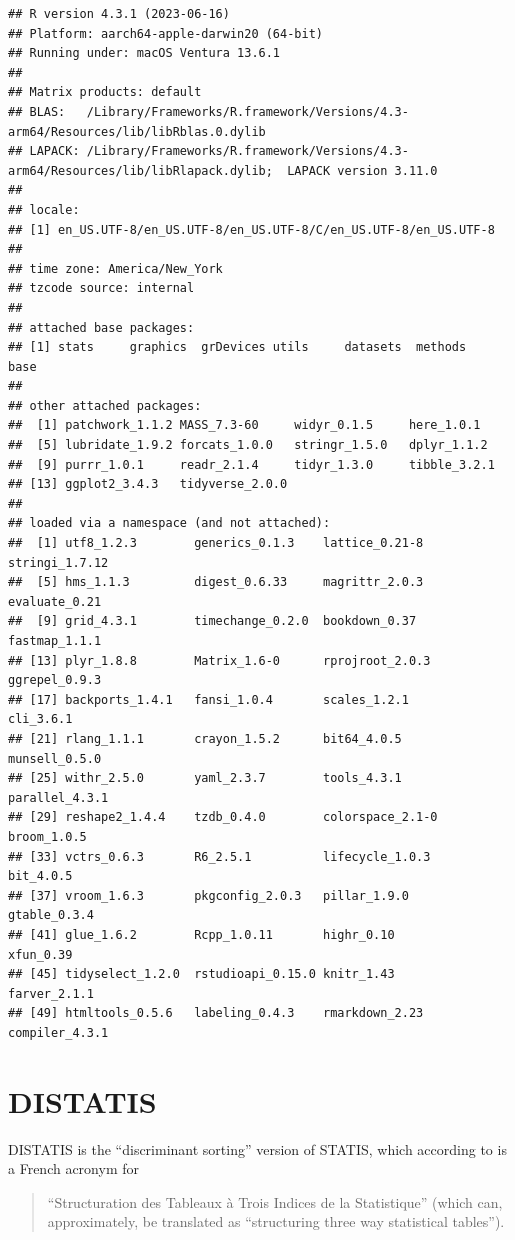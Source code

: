 \documentclass[
]{book}
\begin{document}
\begin{verbatim}
## R version 4.3.1 (2023-06-16)
## Platform: aarch64-apple-darwin20 (64-bit)
## Running under: macOS Ventura 13.6.1
## 
## Matrix products: default
## BLAS:   /Library/Frameworks/R.framework/Versions/4.3-arm64/Resources/lib/libRblas.0.dylib 
## LAPACK: /Library/Frameworks/R.framework/Versions/4.3-arm64/Resources/lib/libRlapack.dylib;  LAPACK version 3.11.0
## 
## locale:
## [1] en_US.UTF-8/en_US.UTF-8/en_US.UTF-8/C/en_US.UTF-8/en_US.UTF-8
## 
## time zone: America/New_York
## tzcode source: internal
## 
## attached base packages:
## [1] stats     graphics  grDevices utils     datasets  methods   base     
## 
## other attached packages:
##  [1] patchwork_1.1.2 MASS_7.3-60     widyr_0.1.5     here_1.0.1     
##  [5] lubridate_1.9.2 forcats_1.0.0   stringr_1.5.0   dplyr_1.1.2    
##  [9] purrr_1.0.1     readr_2.1.4     tidyr_1.3.0     tibble_3.2.1   
## [13] ggplot2_3.4.3   tidyverse_2.0.0
## 
## loaded via a namespace (and not attached):
##  [1] utf8_1.2.3        generics_0.1.3    lattice_0.21-8    stringi_1.7.12   
##  [5] hms_1.1.3         digest_0.6.33     magrittr_2.0.3    evaluate_0.21    
##  [9] grid_4.3.1        timechange_0.2.0  bookdown_0.37     fastmap_1.1.1    
## [13] plyr_1.8.8        Matrix_1.6-0      rprojroot_2.0.3   ggrepel_0.9.3    
## [17] backports_1.4.1   fansi_1.0.4       scales_1.2.1      cli_3.6.1        
## [21] rlang_1.1.1       crayon_1.5.2      bit64_4.0.5       munsell_0.5.0    
## [25] withr_2.5.0       yaml_2.3.7        tools_4.3.1       parallel_4.3.1   
## [29] reshape2_1.4.4    tzdb_0.4.0        colorspace_2.1-0  broom_1.0.5      
## [33] vctrs_0.6.3       R6_2.5.1          lifecycle_1.0.3   bit_4.0.5        
## [37] vroom_1.6.3       pkgconfig_2.0.3   pillar_1.9.0      gtable_0.3.4     
## [41] glue_1.6.2        Rcpp_1.0.11       highr_0.10        xfun_0.39        
## [45] tidyselect_1.2.0  rstudioapi_0.15.0 knitr_1.43        farver_2.1.1     
## [49] htmltools_0.5.6   labeling_0.4.3    rmarkdown_2.23    compiler_4.3.1
\end{verbatim}

\chapter{DISTATIS}\label{distatis}

DISTATIS is the ``discriminant sorting'' version of STATIS, which according to \citet[125]{abdiSTATIS2012} is a French acronym for

\begin{quote}
``Structuration des Tableaux à Trois Indices de la Statistique'' (which can, approximately, be translated as ``structuring three way statistical tables'').
\end{quote}
\end{document}

